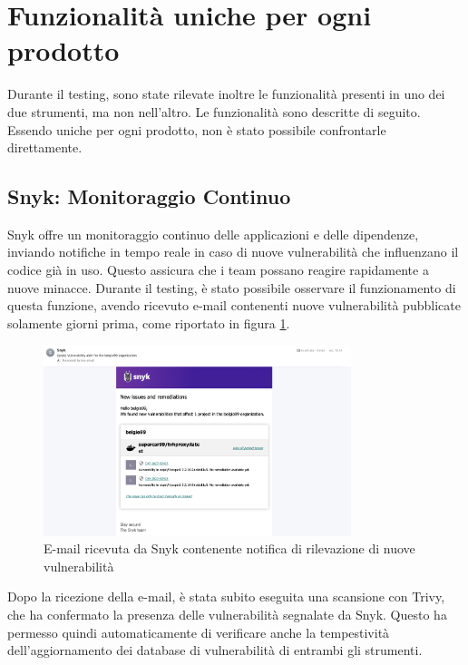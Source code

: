 \section{Funzionalità uniche per ogni prodotto}
Durante il testing, sono state rilevate inoltre le funzionalità presenti in uno dei due strumenti, ma non nell'altro. Le funzionalità sono descritte di seguito. Essendo uniche per ogni prodotto, non è stato possibile confrontarle direttamente.

\subsection{Snyk: Monitoraggio Continuo}
Snyk offre un monitoraggio continuo delle applicazioni e delle dipendenze, inviando notifiche in tempo reale in caso di nuove vulnerabilità che influenzano il codice già in uso. Questo assicura che i team possano reagire rapidamente a nuove minacce. Durante il testing, è stato possibile osservare il funzionamento di questa funzione, avendo ricevuto e-mail contenenti nuove vulnerabilità pubblicate solamente giorni prima, come riportato in figura \ref{fig:snyk_email}.

\begin{figure}[H]
   \centering
   \includegraphics[width=0.8\textwidth]{immagini/capitolo2/snyk_email.png}
   \caption{E-mail ricevuta da Snyk contenente notifica di rilevazione di nuove vulnerabilità}
   \label{fig:snyk_email}
\end{figure}

Dopo la ricezione della e-mail, è stata subito eseguita una scansione con Trivy, che ha confermato la presenza delle vulnerabilità segnalate da Snyk. Questo ha permesso quindi automaticamente di verificare anche la tempestività dell'aggiornamento dei database di vulnerabilità di entrambi gli strumenti.

